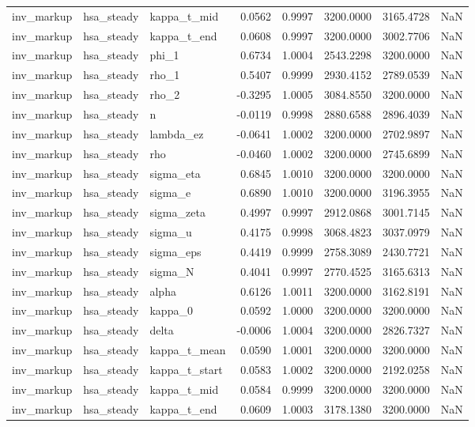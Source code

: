 \begin{tabular}{lllrrrrl}
inv\_markup & hsa\_steady & kappa\_t\_mid & 0.0562 & 0.9997 & 3200.0000 & 3165.4728 & NaN \\
inv\_markup & hsa\_steady & kappa\_t\_end & 0.0608 & 0.9997 & 3200.0000 & 3002.7706 & NaN \\
inv\_markup & hsa\_steady & phi\_1 & 0.6734 & 1.0004 & 2543.2298 & 3200.0000 & NaN \\
inv\_markup & hsa\_steady & rho\_1 & 0.5407 & 0.9999 & 2930.4152 & 2789.0539 & NaN \\
inv\_markup & hsa\_steady & rho\_2 & -0.3295 & 1.0005 & 3084.8550 & 3200.0000 & NaN \\
inv\_markup & hsa\_steady & n & -0.0119 & 0.9998 & 2880.6588 & 2896.4039 & NaN \\
inv\_markup & hsa\_steady & lambda\_ez & -0.0641 & 1.0002 & 3200.0000 & 2702.9897 & NaN \\
inv\_markup & hsa\_steady & rho & -0.0460 & 1.0002 & 3200.0000 & 2745.6899 & NaN \\
inv\_markup & hsa\_steady & sigma\_eta & 0.6845 & 1.0010 & 3200.0000 & 3200.0000 & NaN \\
inv\_markup & hsa\_steady & sigma\_e & 0.6890 & 1.0010 & 3200.0000 & 3196.3955 & NaN \\
inv\_markup & hsa\_steady & sigma\_zeta & 0.4997 & 0.9997 & 2912.0868 & 3001.7145 & NaN \\
inv\_markup & hsa\_steady & sigma\_u & 0.4175 & 0.9998 & 3068.4823 & 3037.0979 & NaN \\
inv\_markup & hsa\_steady & sigma\_eps & 0.4419 & 0.9999 & 2758.3089 & 2430.7721 & NaN \\
inv\_markup & hsa\_steady & sigma\_N & 0.4041 & 0.9997 & 2770.4525 & 3165.6313 & NaN \\
inv\_markup & hsa\_steady & alpha & 0.6126 & 1.0011 & 3200.0000 & 3162.8191 & NaN \\
inv\_markup & hsa\_steady & kappa\_0 & 0.0592 & 1.0000 & 3200.0000 & 3200.0000 & NaN \\
inv\_markup & hsa\_steady & delta & -0.0006 & 1.0004 & 3200.0000 & 2826.7327 & NaN \\
inv\_markup & hsa\_steady & kappa\_t\_mean & 0.0590 & 1.0001 & 3200.0000 & 3200.0000 & NaN \\
inv\_markup & hsa\_steady & kappa\_t\_start & 0.0583 & 1.0002 & 3200.0000 & 2192.0258 & NaN \\
inv\_markup & hsa\_steady & kappa\_t\_mid & 0.0584 & 0.9999 & 3200.0000 & 3200.0000 & NaN \\
inv\_markup & hsa\_steady & kappa\_t\_end & 0.0609 & 1.0003 & 3178.1380 & 3200.0000 & NaN \\

\end{tabular}
